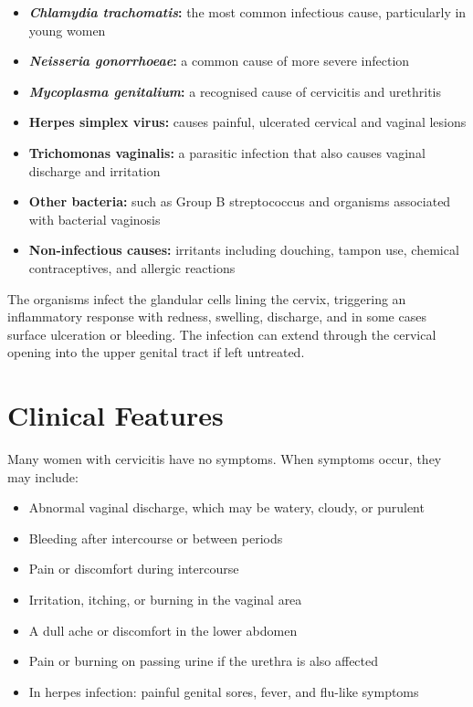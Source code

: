 \begin{itemize}
    \item \textbf{\textit{Chlamydia trachomatis}:} the most common infectious cause, particularly in young women
    \item \textbf{\textit{Neisseria gonorrhoeae}:} a common cause of more severe infection
    \item \textbf{\textit{Mycoplasma genitalium}:} a recognised cause of cervicitis and urethritis
    \item \textbf{Herpes simplex virus:} causes painful, ulcerated cervical and vaginal lesions
    \item \textbf{Trichomonas vaginalis:} a parasitic infection that also causes vaginal discharge and irritation
    \item \textbf{Other bacteria:} such as Group B streptococcus and organisms associated with bacterial vaginosis
    \item \textbf{Non-infectious causes:} irritants including douching, tampon use, chemical contraceptives, and allergic reactions
\end{itemize}

The organisms infect the glandular cells lining the cervix, triggering an inflammatory response with redness, swelling, discharge, and in some cases surface ulceration or bleeding. The infection can extend through the cervical opening into the upper genital tract if left untreated.

\section*{Clinical Features}
Many women with cervicitis have no symptoms. When symptoms occur, they may include:

\begin{itemize}
    \item Abnormal vaginal discharge, which may be watery, cloudy, or purulent
    \item Bleeding after intercourse or between periods
    \item Pain or discomfort during intercourse
    \item Irritation, itching, or burning in the vaginal area
    \item A dull ache or discomfort in the lower abdomen
    \item Pain or burning on passing urine if the urethra is also affected
    \item In herpes infection: painful genital sores, fever, and flu-like symptoms
\end{itemize}

